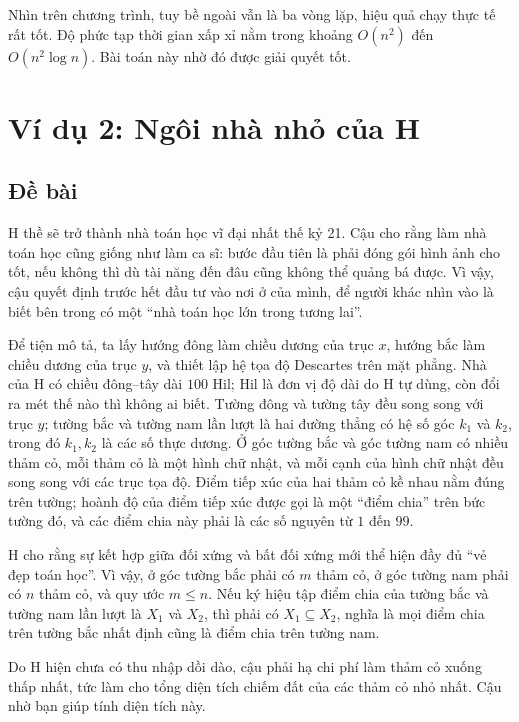 \documentclass[11pt]{article}
\begin{document}
Nhìn trên chương trình, tuy bề ngoài vẫn là ba vòng lặp, hiệu quả chạy thực tế
rất tốt. Độ phức tạp thời gian xấp xỉ nằm trong khoảng
$O(n^2)$ đến $O(n^2\log n)$. Bài toán này nhờ đó được giải quyết tốt.

\section{Ví dụ 2: Ngôi nhà nhỏ của H}

\subsection*{Đề bài}

H thề sẽ trở thành nhà toán học vĩ đại nhất thế kỷ 21. Cậu cho rằng làm nhà
toán học cũng giống như làm ca sĩ: bước đầu tiên là phải đóng gói hình ảnh
cho tốt, nếu không thì dù tài năng đến đâu cũng không thể quảng bá được. Vì
vậy, cậu quyết định trước hết đầu tư vào nơi ở của mình, để người khác nhìn
vào là biết bên trong có một ``nhà toán học lớn trong tương lai''.

Để tiện mô tả, ta lấy hướng đông làm chiều dương của trục $x$, hướng bắc làm
chiều dương của trục $y$, và thiết lập hệ tọa độ Descartes trên mặt phẳng.
Nhà của H có chiều đông--tây dài $100$ Hil; Hil là đơn vị độ dài do H tự dùng,
còn đổi ra mét thế nào thì không ai biết. Tường đông và tường tây đều song
song với trục $y$; tường bắc và tường nam lần lượt là hai đường thẳng có hệ
số góc $k_1$ và $k_2$, trong đó $k_1,k_2$ là các số thực dương. Ở góc tường
bắc và góc tường nam có nhiều thảm cỏ, mỗi thảm cỏ là một hình chữ nhật, và
mỗi cạnh của hình chữ nhật đều song song với các trục tọa độ. Điểm tiếp xúc
của hai thảm cỏ kề nhau nằm đúng trên tường; hoành độ của điểm tiếp xúc được
gọi là một ``điểm chia'' trên bức tường đó, và các điểm chia này phải là các
số nguyên từ $1$ đến $99$.

H cho rằng sự kết hợp giữa đối xứng và bất đối xứng mới thể hiện đầy đủ
``vẻ đẹp toán học''. Vì vậy, ở góc tường bắc phải có $m$ thảm cỏ, ở góc tường
nam phải có $n$ thảm cỏ, và quy ước $m\le n$. Nếu ký hiệu tập điểm chia của
tường bắc và tường nam lần lượt là $X_1$ và $X_2$, thì phải có
$X_1\subseteq X_2$, nghĩa là mọi điểm chia trên tường bắc nhất định cũng là
điểm chia trên tường nam.

Do H hiện chưa có thu nhập dồi dào, cậu phải hạ chi phí làm thảm cỏ xuống
thấp nhất, tức làm cho tổng diện tích chiếm đất của các thảm cỏ nhỏ nhất. Cậu
nhờ bạn giúp tính diện tích này.
\end{document}
